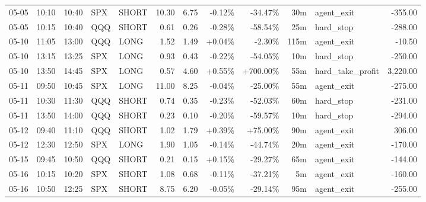 \documentclass[11pt,a4paper,twoside]{article}
\begin{document}
\begin{center}
\begin{longtable}{>{\color{txtmain}}l l l l l r r r r r >{\color{txtmain}}l r}
05-05 & 10:10 & 10:40 & SPX & SHORT & 10.30 & 6.75 & \textcolor{lossred}{-0.12\%} & \textcolor{lossred}{-34.47\%} & 30m & agent\_exit & \textcolor{lossred}{-355.00} \\
05-05 & 10:15 & 10:40 & QQQ & SHORT & 0.61 & 0.26 & \textcolor{lossred}{-0.28\%} & \textcolor{lossred}{-58.54\%} & 25m & hard\_stop & \textcolor{lossred}{-288.00} \\
05-10 & 11:05 & 13:00 & QQQ & LONG & 1.52 & 1.49 & \textcolor{wingreen}{+0.04\%} & \textcolor{lossred}{-2.30\%} & 115m & agent\_exit & \textcolor{lossred}{-10.50} \\
05-10 & 13:15 & 13:25 & SPX & LONG & 0.93 & 0.43 & \textcolor{lossred}{-0.22\%} & \textcolor{lossred}{-54.05\%} & 10m & hard\_stop & \textcolor{lossred}{-250.00} \\
05-10 & 13:50 & 14:45 & SPX & LONG & 0.57 & 4.60 & \textcolor{wingreen}{+0.55\%} & \textcolor{wingreen}{+700.00\%} & 55m & hard\_take\_profit & \textcolor{wingreen}{3,220.00} \\
05-11 & 09:50 & 10:45 & SPX & LONG & 11.00 & 8.25 & \textcolor{lossred}{-0.04\%} & \textcolor{lossred}{-25.00\%} & 55m & agent\_exit & \textcolor{lossred}{-275.00} \\
05-11 & 10:30 & 11:30 & QQQ & SHORT & 0.74 & 0.35 & \textcolor{lossred}{-0.23\%} & \textcolor{lossred}{-52.03\%} & 60m & hard\_stop & \textcolor{lossred}{-231.00} \\
05-11 & 13:50 & 14:00 & QQQ & SHORT & 0.23 & 0.10 & \textcolor{lossred}{-0.20\%} & \textcolor{lossred}{-59.57\%} & 10m & hard\_stop & \textcolor{lossred}{-294.00} \\
05-12 & 09:40 & 11:10 & QQQ & SHORT & 1.02 & 1.79 & \textcolor{wingreen}{+0.39\%} & \textcolor{wingreen}{+75.00\%} & 90m & agent\_exit & \textcolor{wingreen}{306.00} \\
05-12 & 12:30 & 12:50 & SPX & LONG & 1.90 & 1.05 & \textcolor{lossred}{-0.14\%} & \textcolor{lossred}{-44.74\%} & 20m & agent\_exit & \textcolor{lossred}{-170.00} \\
05-15 & 09:45 & 10:50 & QQQ & SHORT & 0.21 & 0.15 & \textcolor{wingreen}{+0.15\%} & \textcolor{lossred}{-29.27\%} & 65m & agent\_exit & \textcolor{lossred}{-144.00} \\
05-16 & 10:15 & 10:20 & SPX & SHORT & 1.08 & 0.68 & \textcolor{lossred}{-0.11\%} & \textcolor{lossred}{-37.21\%} & 5m & agent\_exit & \textcolor{lossred}{-160.00} \\
05-16 & 10:50 & 12:25 & SPX & SHORT & 8.75 & 6.20 & \textcolor{lossred}{-0.05\%} & \textcolor{lossred}{-29.14\%} & 95m & agent\_exit & \textcolor{lossred}{-255.00} \\

\end{longtable}
\end{center}
\end{document}
